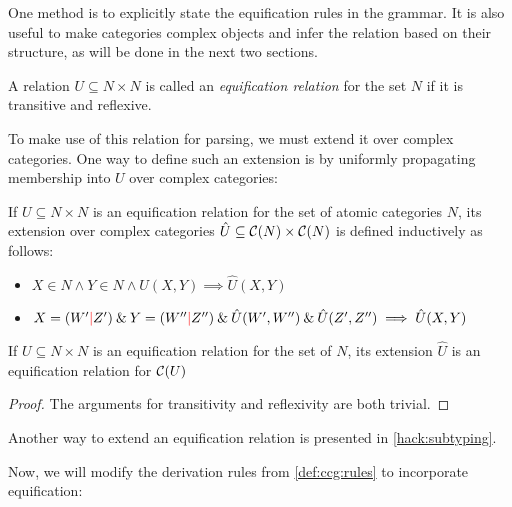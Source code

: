 \documentclass[main.tex]{subfiles}
\begin{document}
One method is to explicitly state the equification rules in the grammar.
It is also useful to make categories complex objects and infer the relation
based on their structure, as will be done in the next two sections.

\begin{defn}
    A relation $U \subseteq N \times N$ is called an
    \emph{equification relation} for the set $N$ if it is transitive
    and reflexive.
\end{defn}

To make use of this relation for parsing, we must extend it over complex categories.
One way to define such an extension is by uniformly propagating membership
into $U$ over complex categories:
\begin{defn}\label{def:rel:uniform}
    If $U \subseteq N \times N$ is an equification relation
    for the set of
    atomic categories $N$, its extension over complex categories
    $\hat{U} \subseteq \mathcal{C}( N ) \times \mathcal{C}( N )$ is defined
    inductively as follows:
    \begin{itemize}
        \item $X \in N \land Y \in N \land U(X, Y) \implies \hat{U}(X, Y)$
        \item $X = (W' \textcolor{red}{|} Z') \mathbin{\&} Y = (W'' \textcolor{red}{|} Z'') \mathbin{\&} \hat{U}(W', W'')
        \mathbin{\&} \hat{U}(Z', Z'') \implies \hat{U}(X, Y)$
    \end{itemize}
\end{defn}

\begin{property}
    If $U \subseteq N \times N$ is an equification relation
    for the set of
    $N$, its extension $\hat{U}$ is an equification relation for $\mathcal{C}( U )$
\end{property}
\begin{proof}
    The arguments for transitivity and reflexivity are both trivial.
\end{proof}

Another way to extend an equification relation is presented in \cref{hack:subtyping}.

Now, we will modify the derivation rules from \cref{def:ccg:rules} to incorporate
equification:
\end{document}
